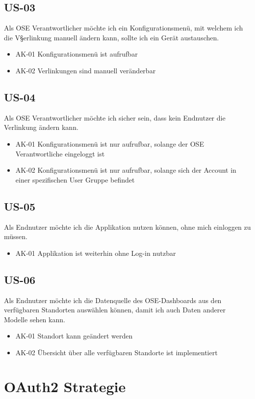 \subsection{US-03}
Als OSE Verantwortlicher möchte ich ein Konfigurationsmenü, mit welchem ich die V§erlinkung manuell ändern kann, sollte ich ein Gerät austauschen.
\begin{itemize}
  \item AK-01 Konfigurationsmenü ist aufrufbar
  \item AK-02 Verlinkungen sind manuell veränderbar
\end{itemize}
\subsection{US-04}
Als OSE Verantwortlicher möchte ich sicher sein, dass kein Endnutzer die Verlinkung ändern kann.
\begin{itemize}
  \item AK-01 Konfigurationsmenü ist nur aufrufbar, solange der OSE Verantwortliche eingeloggt ist
  \item AK-02 Konfigurationsmenü ist nur aufrufbar, solange sich der Account in einer spezifischen User Gruppe befindet
\end{itemize}
\subsection{US-05}
Als Endnutzer möchte ich die Applikation nutzen können, ohne mich einloggen zu müssen.
\begin{itemize}
  \item AK-01 Applikation ist weiterhin ohne Log-in nutzbar
\end{itemize}
\subsection{US-06}
Als Endnutzer möchte ich die Datenquelle des OSE-Dashboards aus den verfügbaren Standorten auswählen können, damit ich auch Daten anderer Modelle sehen kann.
\begin{itemize}
  \item AK-01 Standort kann geändert werden
  \item AK-02 Übersicht über alle verfügbaren Standorte ist implementiert
\end{itemize}
\section{OAuth2 Strategie}\label{oauth2-strat}
